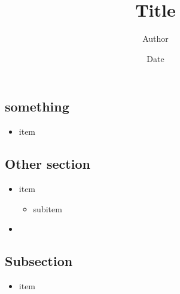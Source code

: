\documentclass[11pt]{article}
\title{Title}
\author{Author}
\date{Date}
\let\originalitem\item
\renewcommand{\item}{\originalitem[]}
\newcommand{\Newpage}{\end{preview}\begin{preview}}
\begin{document}
\begin{preview}


\maketitle

\Newpage

\section{something}

\begin{itemize}
	\item item
\end{itemize}

\Newpage

\section{Other section}

\begin{itemize}
	\item item
	\begin{itemize}
		\item subitem
	\end{itemize}
	\item 
\end{itemize}

\subsection{Subsection}

\begin{itemize}
	\item item
\end{itemize}

\end{preview}
\end{document}
